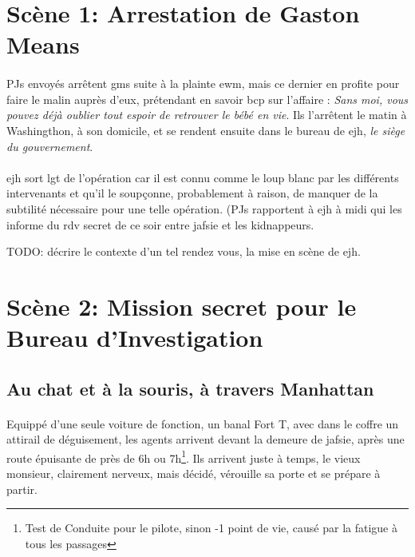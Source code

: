 \documentclass[a4paper,10pt]{article}
\begin{document}
\section{Scène 1: Arrestation de Gaston Means}

\paragraph{} PJs envoyés arrêtent \gls{gms} suite à la plainte \gls{ewm}, mais ce dernier en profite pour faire le malin 
auprès d'eux, prétendant en savoir bcp sur l'affaire : \emph{Sans moi, vous pouvez déjà oublier tout espoir de retrouver le 
bébé en vie}. Ils l'arrêtent le matin à Washingthon, à son domicile, et se rendent ensuite dans le bureau de \gls{ejh}, 
\emph{le siège du gouvernement}.

\paragraph{} \gls{ejh} sort \gls{lgt} de l'opération car il est connu comme le loup blanc par les différents intervenants et 
qu'il le soupçonne, probablement à raison, de manquer de la subtilité nécessaire pour une telle opération. (PJs rapportent à 
\gls{ejh} à midi qui les informe du rdv secret de ce soir entre \gls{jafsie} et les kidnappeurs.

TODO: décrire le contexte d'un tel rendez vous, la mise en scène de \gls{ejh}.

\section{Scène 2: Mission secret pour le Bureau d'Investigation}

\subsection{Au chat et à la souris, à travers Manhattan}

\paragraph{} Equippé d'une seule voiture de fonction, un banal Fort T, avec dans le coffre un attirail de déguisement, les 
agents arrivent devant la demeure de \gls{jafsie}, après une route épuisante de près de 6h ou 7h\footnote{Test de Conduite pour 
le pilote, sinon -1 point de vie, causé par la fatigue à tous les passages}. Ils arrivent juste à temps, le vieux monsieur, 
clairement nerveux, mais décidé, vérouille sa porte et se prépare à partir.
\end{document}
